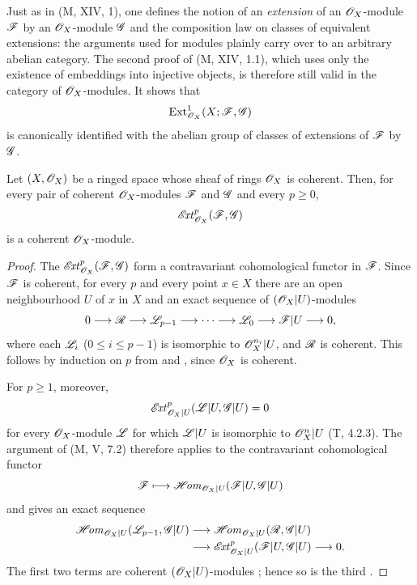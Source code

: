 \begin{env}[12.3.2]
\label{0.12.3.2}
Just as in (M, XIV, 1), one defines the notion of an
\emph{extension} of an $\mathscr{O}_X$-module $\mathscr{F}$ by an
$\mathscr{O}_X$-module $\mathscr{G}$ and the composition law on classes of
equivalent extensions: the arguments used for modules plainly carry
over to an arbitrary abelian category.
The second proof of (M, XIV, 1.1), which uses only the existence of
embeddings into injective objects, is therefore still valid in the
category of $\mathscr{O}_X$-modules.  It shows that
\[
  \operatorname{Ext}^1_{\mathscr{O}_X}(X;\mathscr{F},\mathscr{G})
\]
is canonically identified with the abelian group of classes of
extensions of $\mathscr{F}$ by $\mathscr{G}$.
\end{env}

\begin{proposition}[12.3.3]
\label{0.12.3.3}
Let $(X,\mathscr{O}_X)$ be a ringed space whose sheaf of rings
$\mathscr{O}_X$ is coherent.
Then, for every pair of coherent $\mathscr{O}_X$-modules $\mathscr{F}$ and
$\mathscr{G}$ and every $p\geq0$,
\[
  \mathscr{E}\!\mathit{xt}^p_{\mathscr{O}_X}(\mathscr{F},\mathscr{G})
\]
is a coherent $\mathscr{O}_X$-module.
\end{proposition}

\begin{proof}
The $\mathscr{E}\!\mathit{xt}^p_{\mathscr{O}_X}(\mathscr{F},\mathscr{G})$ form a contravariant
cohomological functor in $\mathscr{F}$.
Since $\mathscr{F}$ is coherent, for every $p$ and every point $x\in X$
there are an open neighbourhood $U$ of $x$ in $X$ and an exact
sequence of $(\mathscr{O}_X|U)$-modules
\[
  0\longrightarrow\mathscr{R}\longrightarrow\mathscr{L}_{p-1}
  \longrightarrow\cdots\longrightarrow\mathscr{L}_0
  \longrightarrow\mathscr{F}|U\longrightarrow0,
\]
where each $\mathscr{L}_i$ ($0\leq i\leq p-1$) is isomorphic to
$\mathscr{O}_X^{n_i}|U$, and $\mathscr{R}$ is coherent.
This follows by induction on $p$ from
 and
, since $\mathscr{O}_X$ is coherent.

For $p\geq1$, moreover,
\[
  \mathscr{E}\!\mathit{xt}^p_{\mathscr{O}_X|U}(\mathscr{L}|U,\mathscr{G}|U)=0
\]
for every $\mathscr{O}_X$-module $\mathscr{L}$ for which $\mathscr{L}|U$ is
isomorphic to $\mathscr{O}_X^n|U$ (T, 4.2.3).
The argument of (M, V, 7.2) therefore applies to the contravariant
cohomological functor
\[
  \mathscr{F}\longmapsto
  \mathscr{H}\!\mathit{om}_{\mathscr{O}_X|U}(\mathscr{F}|U,\mathscr{G}|U)
\]
and gives an exact sequence
\[
  \begin{aligned}
  \mathscr{H}\!\mathit{om}_{\mathscr{O}_X|U}(\mathscr{L}_{p-1},\mathscr{G}|U)
  &\longrightarrow
  \mathscr{H}\!\mathit{om}_{\mathscr{O}_X|U}(\mathscr{R},\mathscr{G}|U)\\
  &\longrightarrow
  \mathscr{E}\!\mathit{xt}^p_{\mathscr{O}_X|U}(\mathscr{F}|U,\mathscr{G}|U)
  \longrightarrow0.
  \end{aligned}
\]
The first two terms are coherent $(\mathscr{O}_X|U)$-modules
; hence so is the third
.
\end{proof}

